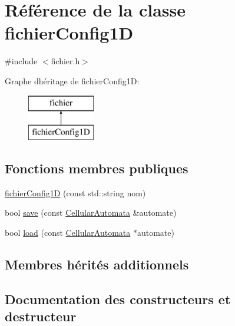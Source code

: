 \hypertarget{classfichier_config1_d}{}\section{Référence de la classe fichier\+Config1D}
\label{classfichier_config1_d}


{\ttfamily \#include $<$fichier.\+h$>$}

Graphe d\textquotesingle{}héritage de fichier\+Config1D\+:\begin{figure}[H]
\begin{center}
\leavevmode
\includegraphics[height=2.000000cm]{classfichier_config1_d}
\end{center}
\end{figure}
\subsection*{Fonctions membres publiques}
\begin{DoxyCompactItemize}
\item 
\mbox{\hyperlink{classfichier_config1_d_ab762d4c2b8caeb4ae175ea04f696b94a}{fichier\+Config1D}} (const std\+::string nom)
\item 
bool \mbox{\hyperlink{classfichier_config1_d_a759fa0735b22b3f5cceeb0fb414fc056}{save}} (const \mbox{\hyperlink{class_cellular_automata}{Cellular\+Automata}} \&automate)
\item 
bool \mbox{\hyperlink{classfichier_config1_d_a598c6ad0c9c16735b6c5843198dcc682}{load}} (const \mbox{\hyperlink{class_cellular_automata}{Cellular\+Automata}} $\ast$automate)
\end{DoxyCompactItemize}
\subsection*{Membres hérités additionnels}


\subsection{Documentation des constructeurs et destructeur}
\mbox{\label{classfichier_config1_d_ab762d4c2b8caeb4ae175ea04f696b94a}} 
